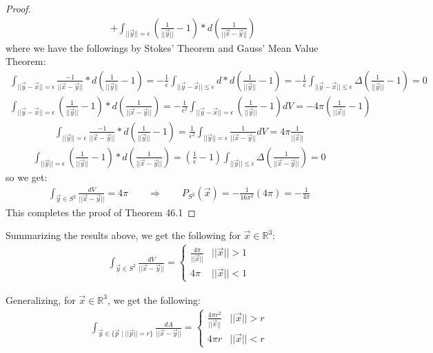 \documentclass[11pt,oneside]{book}
\theoremstyle{break}
\theoremstyle{break}
\newcommand{\R}{\mathbb{R}}
\begin{document}
\begin{proof}
\begin{align*}
&+\int_{||\vec{y}|| = \epsilon}\left( \frac{1}{||\vec{y}||}-1\right)*d\left(\frac{1}{||\vec{x}-\vec{y}||}\right)
\end{align*}
where we have the followings by Stokes' Theorem and Gauss' Mean Value Theorem:
\begin{align*}
\int_{||\vec{y} - \vec{x}|| = \epsilon} \frac{-1}{||\vec{x}-\vec{y}||}*d\left(\frac{1}{||\vec{y}||} - 1\right) = -\frac{1}{\epsilon}\int_{||\vec{y}-\vec{x}|| \leq \epsilon} d*d\left(\frac{1}{||\vec{y}||}-1\right)= -\frac{1}{\epsilon}\int_{||\vec{y}-\vec{x}|| \leq \epsilon} \Delta\left(\frac{1}{||\vec{y}||}-1\right) = 0
\end{align*}
\begin{align*}
\int_{||\vec{y} - \vec{x}|| = \epsilon}\left( \frac{1}{||\vec{y}||}-1\right)*d\left(\frac{1}{||\vec{x}-\vec{y}||}\right) = -\frac{1}{\epsilon^2}\int_{||\vec{y}-\vec{x}|| = \epsilon}\left( \frac{1}{||\vec{y}||}-1\right) dV = -4\pi \left( \frac{1}{||\vec{x}||}-1\right)
\end{align*}
\begin{align*}
\int_{||\vec{y} || = \epsilon} \frac{-1}{||\vec{x}-\vec{y}||}*d\left(\frac{1}{||\vec{y}||} - 1\right) = \frac{1}{\epsilon^2}\int_{||\vec{y} || = \epsilon} \frac{1}{||\vec{x} - \vec{y}||}dV = 4\pi \frac{1}{||\vec{x}||}
\end{align*}
\begin{align*}
\int_{||\vec{y}|| = \epsilon}\left( \frac{1}{||\vec{y}||}-1\right)*d\left(\frac{1}{||\vec{x}-\vec{y}||}\right) = \left(\frac{1}{\epsilon}-1\right)\int_{||\vec{y}||\leq \epsilon} \Delta\left( \frac{1}{||\vec{x}-\vec{y}||}\right) = 0
\end{align*}
so we get:
\begin{align*}
\int_{\vec{y}\in S^2}\frac{dV}{||\vec{x}-\vec{y}||}  = 4\pi \qquad\Rightarrow\qquad P_{S^2}(\vec{x}) = -\frac{1}{16\pi^2}(4\pi) = -\frac{1}{4\pi}
\end{align*}
This completes the proof of Theorem 46.1
\end{proof}
Summarizing the results above, we get the following for $\vec{x}\in \R^3$:
\begin{align*}
\int_{\vec{y}\in S^2}\frac{dV}{||\vec{x}-\vec{y}||} = \begin{cases} \frac{4\pi}{||\vec{x}||} & ||\vec{x}|| >1\\
4\pi & ||\vec{x}|| <1 
\end{cases}
\end{align*}

Generalizing, for $\vec{x}\in \R^3$, we get the following:
\begin{align*}
\int_{\vec{y}\in \{\vec{p}\mid ||\vec{p}||=r\} }\frac{dA}{||\vec{x}-\vec{y}||} = \begin{cases} \frac{4\pi r^2}{||\vec{x}||} & ||\vec{x}|| >r\\
4\pi r & ||\vec{x}|| <r 
\end{cases}
\end{align*}
\end{document}
